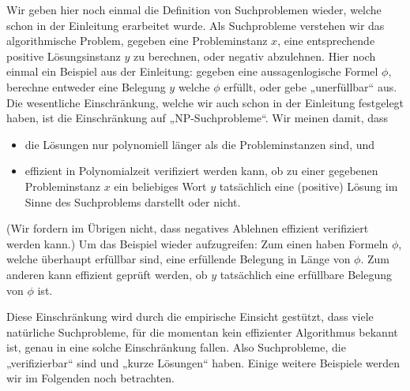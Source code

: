 Wir geben hier noch einmal die Definition von Suchproblemen wieder, welche schon in der Einleitung erarbeitet wurde.
Als Suchprobleme verstehen wir das algorithmische Problem, gegeben eine Probleminstanz $x$, eine entsprechende positive Lösungsinstanz $y$ zu berechnen, oder negativ abzulehnen.  Hier noch einmal ein Beispiel aus der Einleitung: gegeben eine aussagenlogische Formel $\phi$, berechne entweder eine Belegung $y$ welche $\phi$ erfüllt, oder gebe „unerfüllbar“ aus.
Die wesentliche Einschränkung, welche wir auch schon in der Einleitung festgelegt haben, ist die Einschränkung auf „NP-Suchprobleme“. Wir meinen damit, dass
\begin{itemize}
    \item die Lösungen nur polynomiell länger als die Probleminstanzen sind, und
    \item effizient in Polynomialzeit verifiziert werden kann, ob zu einer gegebenen Probleminstanz $x$ ein beliebiges Wort $y$ tatsächlich eine (positive) Lösung im Sinne des Suchproblems darstellt oder nicht.
\end{itemize}
(Wir fordern im Übrigen nicht, dass negatives Ablehnen effizient verifiziert werden kann.)
Um das Beispiel wieder aufzugreifen: Zum einen haben Formeln $\phi$, welche überhaupt erfüllbar sind, eine erfüllende Belegung in Länge von $\phi$. Zum anderen kann effizient geprüft werden, ob $y$ tatsächlich eine erfüllbare Belegung von $\phi$ ist.

Diese Einschränkung wird durch die empirische Einsicht gestützt, dass viele natürliche Suchprobleme, für die momentan kein effizienter Algorithmus bekannt ist, genau in eine solche Einschränkung fallen. Also Suchprobleme, die „verifizierbar“ sind und „kurze Lösungen“ haben. Einige weitere Beispiele werden wir im Folgenden noch betrachten.

